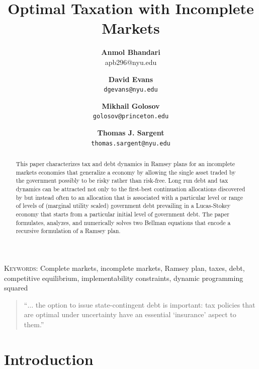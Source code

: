\documentclass[12pt]{article}
\title {Optimal Taxation with Incomplete Markets}
\author{\textbf{Anmol Bhandari}\\apb296@nyu.edu \and \textbf{David Evans} \\ \texttt{dgevans@nyu.edu} \and \textbf{Mikhail Golosov}\\\texttt{golosov@princeton.edu} \and \textbf{Thomas J. Sargent} \\ \texttt{thomas.sargent@nyu.edu}
}
\begin{document}
\maketitle



\begin{abstract}  This paper characterizes tax and debt dynamics in Ramsey plans for an incomplete markets economies that generalize
a \citet{Aiyagari2002} economy by allowing the single asset traded by the government possibly to be risky rather than risk-free.  
Long run debt and tax dynamics can be attracted  not only to the first-best continuation allocations discovered by \citeauthor{Aiyagari2002} but instead often
 to an allocation that is associated with a particular level or range of  levels of (marginal utility scaled) government debt prevailing in a Lucas-Stokey
economy that starts from a particular initial level of government debt.  The paper formulates, analyzes, and numerically solves two Bellman equations
that encode a recursive formulation of a Ramsey plan.



\end{abstract}


\noindent\textsc{Keywords:} Complete markets, incomplete markets, Ramsey plan, taxes, debt, competitive equilibrium, implementability constraints,
dynamic programming squared

\begin{quote}
``$\ldots$ the option to issue state-contingent debt is important: tax policies that
are optimal under uncertainty have an essential `insurance' aspect to them.'' \quad \citet[p.~88]{LucasJr.1983}
\end{quote}

\section{Introduction}
\end{document}
